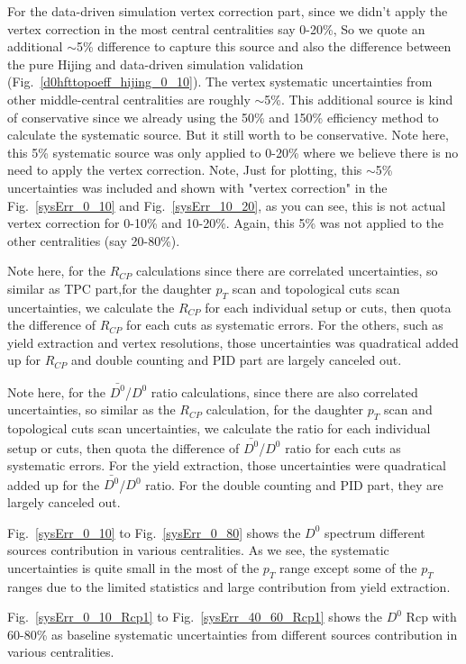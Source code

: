 For the data-driven simulation vertex correction part, since we didn't apply the vertex correction in the most central centralities say 0-20\%, So we quote an additional $\sim$5\% difference to capture this source and also the difference between the pure Hijing and data-driven simulation validation (Fig.~\ref{d0hfttopoeff_hijing_0_10}). The vertex systematic uncertainties from other middle-central centralities are roughly $\sim$5\%. This additional source is kind of conservative since we already using the 50\% and 150\% efficiency method to calculate the systematic source. But it still worth to be conservative. Note here, this 5\% systematic source was only applied to 0-20\% where we believe there is no need to apply the vertex correction. Note, Just for plotting, this $\sim$5\% uncertainties was included and shown with "vertex correction" in the Fig.~\ref{sysErr_0_10} and Fig.~\ref{sysErr_10_20}, as you can see, this is not actual vertex correction for 0-10\% and 10-20\%. Again, this 5\% was not applied to the other centralities (say 20-80\%).

Note here, for the $R_{CP}$ calculations since there are correlated uncertainties, so similar as TPC part,for the daughter $p_T$ scan and topological cuts scan uncertainties, we calculate the $R_{CP}$ for each individual setup or cuts, then quota the difference of $R_{CP}$ for each cuts as systematic errors. For the others, such as yield extraction and vertex resolutions, those uncertainties was quadratical added up for $R_{CP}$ and double counting and PID part are largely canceled out.

Note here, for the $\bar{D^{0}}$/$D^{0}$ ratio calculations, since there are also correlated uncertainties, so similar as the $R_{CP}$ calculation, for the daughter $p_T$ scan and topological cuts scan uncertainties, we calculate the ratio for each individual setup or cuts, then quota the difference of $\bar{D^{0}}$/$D^{0}$ ratio for each cuts as systematic errors. For the yield extraction, those uncertainties were quadratical added up for the $\bar{D^{0}}$/$D^{0}$ ratio. For the double counting and PID part, they are largely canceled out.

Fig.~\ref{sysErr_0_10} to Fig.~\ref{sysErr_0_80} shows the $D^0$ spectrum different sources contribution in various centralities. As we see, the systematic uncertainties is quite small in the most of the $p_T$ range except some of the $p_T$ ranges due to the limited statistics and large contribution from yield extraction.

Fig.~\ref{sysErr_0_10_Rcp1} to Fig.~\ref{sysErr_40_60_Rcp1} shows the $D^0$ Rcp with 60-80\% as baseline systematic uncertainties from different sources contribution in various centralities. 

